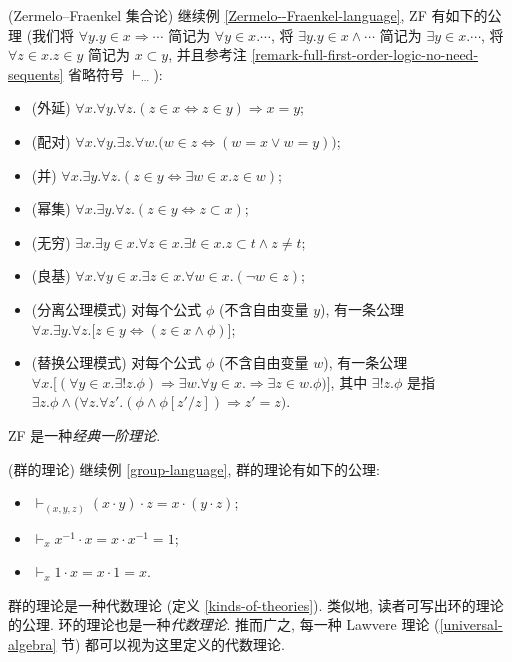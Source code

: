 \begin{example}
	[label={ZF-set-theory}]
	{(Zermelo--Fraenkel 集合论)}
	继续例 \ref{Zermelo--Fraenkel-language}, ZF 有如下的公理 (我们将 $\forall y.y\in x\Rightarrow\cdots$ 简记为 $\forall y\in x.\cdots$, 将 $\exists y.y\in x\land\cdots$ 简记为 $\exists y\in x.\cdots$, 将 $\forall z\in x.z\in y$ 简记为 $x\subset y$, 并且参考注 \ref{remark-full-first-order-logic-no-need-sequents} 省略符号 $\vdash_{\cdots}$):
	\begin{itemize}
		\item (外延) $\forall x.\forall y.\forall z. (z\in x  \Leftrightarrow z\in y) \Rightarrow x=y$;
		\item (配对) $\forall x.\forall y.\exists z.\forall w.\big(w\in z \Leftrightarrow (w=x \lor w=y)\big)$;
		\item (并) $\forall x.\exists y.\forall z. (z\in y \Leftrightarrow \exists w\in x. z\in w)$;
		\item (幂集) $\forall x.\exists y.\forall z. (z\in y \Leftrightarrow z\subset x)$;
		\item (无穷) $\exists x.\exists y\in x.\forall z\in x.\exists t\in x.z\subset t\land z\neq t$;
		\item (良基) $\forall x. \forall y\in x. \exists z\in x. \forall w\in x.(\neg w\in z)$;
		\item (分离公理模式) 对每个公式 $\phi$ (不含自由变量 $y$), 有一条公理 $\forall x.\exists y.\forall z. \big[z\in y\Leftrightarrow (z\in x\land \phi)\big]$;
		\item (替换公理模式) 对每个公式 $\phi$ (不含自由变量 $w$), 有一条公理 $\forall x.\big[(\forall y\in x.\exists ! z. \phi)
		\Rightarrow \exists w.\forall y\in x. \Rightarrow \exists z\in w.\phi)\big]$, 其中 $\exists ! z.\phi$ 是指 $\exists z.\phi \land\big( \forall z.\forall z'. (\phi\land\phi[z'/z])\Rightarrow z'=z\big)$.
	\end{itemize}
	ZF 是一种\emph{经典一阶理论}.
\end{example}

\begin{example}
	[label={theory-of-groups}]
	{(群的理论)}
	继续例 \ref{group-language}, 群的理论有如下的公理:
	\begin{itemize}
		\item $\vdash_{(x,y,z)}(x\cdot y)\cdot z = x\cdot (y\cdot z)$;
		\item $\vdash_x x^{-1}\cdot x = x\cdot x^{-1} = 1$;
		\item $\vdash_x 1\cdot x = x\cdot 1 = x$.
	\end{itemize}
	群的理论是一种代数理论 (定义 \ref{kinds-of-theories}).
	类似地, 读者可写出环的理论的公理. 环的理论也是一种\emph{代数理论}. 推而广之, 每一种 Lawvere 理论 (\ref{universal-algebra} 节) 都可以视为这里定义的代数理论.
\end{example}

